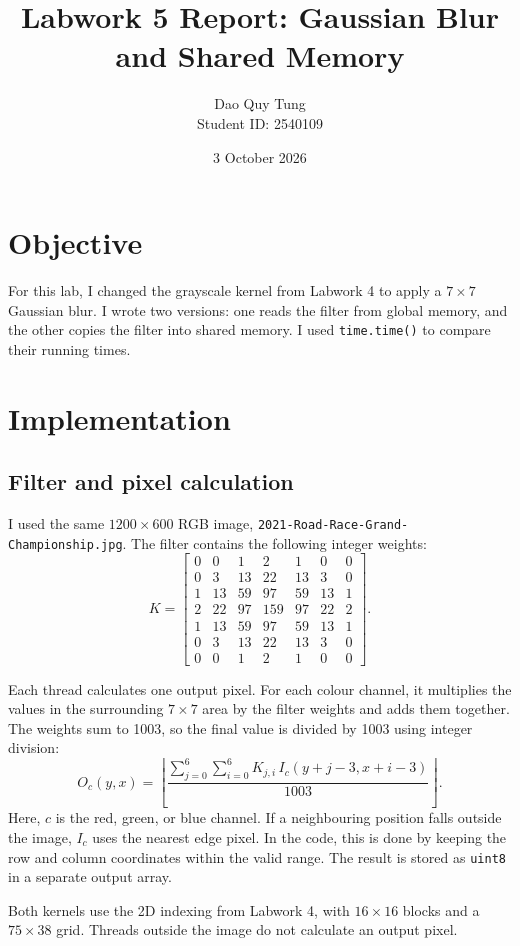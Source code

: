 \documentclass[11pt,a4paper]{article}
\title{Labwork 5 Report: Gaussian Blur and Shared Memory}
\author{Dao Quy Tung \\ Student ID: 2540109}
\date{3 October 2026}
\begin{document}
\maketitle

\section{Objective}
For this lab, I changed the grayscale kernel from Labwork 4 to apply a
$7\times7$ Gaussian blur. I wrote two versions: one reads the filter from
global memory, and the other copies the filter into shared memory.
I used \texttt{time.time()} to compare their running times.

\section{Implementation}
\subsection{Filter and pixel calculation}
I used the same $1200\times600$ RGB image,
\texttt{2021-Road-Race-Grand-Championship.jpg}. The filter contains the
following integer weights:
\[
K=
\begin{bmatrix}
0 & 0 & 1 & 2 & 1 & 0 & 0\\
0 & 3 & 13 & 22 & 13 & 3 & 0\\
1 & 13 & 59 & 97 & 59 & 13 & 1\\
2 & 22 & 97 & 159 & 97 & 22 & 2\\
1 & 13 & 59 & 97 & 59 & 13 & 1\\
0 & 3 & 13 & 22 & 13 & 3 & 0\\
0 & 0 & 1 & 2 & 1 & 0 & 0
\end{bmatrix}.
\]

Each thread calculates one output pixel. For each colour channel, it
multiplies the values in the surrounding $7\times7$ area by the filter
weights and adds them together. The weights sum to 1003, so the final
value is divided by 1003 using integer division:
\[
O_c(y,x)=
\left\lfloor
\frac{\displaystyle\sum_{j=0}^{6}\sum_{i=0}^{6}
K_{j,i}\,I_c(y+j-3,x+i-3)}{1003}
\right\rfloor.
\]
Here, $c$ is the red, green, or blue channel. If a neighbouring position
falls outside the image, $I_c$ uses the nearest edge pixel. In the code,
this is done by keeping the row and column coordinates within the valid
range. The result is stored as \texttt{uint8} in a separate output array.

Both kernels use the 2D indexing from Labwork 4, with
$16\times16$ blocks and a $75\times38$ grid. Threads outside the image
do not calculate an output pixel.
\end{document}
